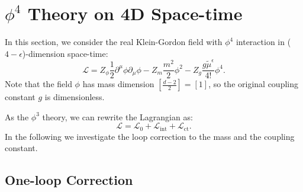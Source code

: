 \section{$\phi^4$ Theory on 4D Space-time}
In this section, we consider the real Klein-Gordon field with $\phi^4$ interaction in ($4-\epsilon$)-dimension space-time:
\begin{equation}
	\mathcal{L}
	= Z_{\phi}\frac{1}{2} \partial^\mu\phi\partial_\mu\phi - 
	Z_m \frac{m^2}{2}\phi^2 - Z_g\frac{g \tilde{\mu}^\epsilon}{4!}\phi^4.
\end{equation}
Note that the field $\phi$ has mass dimension $[\frac{d-2}{2}]=[1]$, so the original coupling constant $g$ is dimensionless.

As the $\phi^3$ theory, we can rewrite the Lagrangian as:
\begin{equation}
	\mathcal L = \mathcal L_0 + \mathcal L_{\mathrm{int}} + \mathcal L_{\mathrm{ct}}.
\end{equation}
In the following we investigate the loop correction to the mass and the coupling constant.


\subsection{One-loop Correction}
